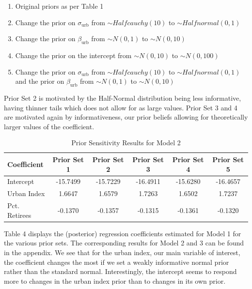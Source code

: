 \documentclass[12pt]{article}
\begin{document}
\begin{enumerate}
    \item Original priors as per Table 1
    \item Change the prior on \(\sigma_\text{urb}\) from \(\sim Halfcauchy(10)\) to \(\sim Halfnormal(0, 1)\)
    \item Change  the prior on \(\beta_\text{urb}\) from \(\sim N(0, 1)\) to \(\sim N(0, 10)\)
    \item Change  the prior on the intercept from \(\sim N(0, 10)\) to \(\sim N(0, 100)\)
    \item Change the prior on \(\sigma_\text{urb}\) from \(\sim Halfcauchy(10)\) to \(\sim Halfnormal(0, 1)\) and the prior on \(\beta_\text{urb}\) from \(\sim N(0, 1)\) to \(\sim N(0, 10)\)
\end{enumerate}

Prior Set 2 is motivated by the Half-Normal distribution being less informative, having thinner tails which does not allow for as large values. Prior Set 3 and 4 are motivated again by informativeness, our prior beliefs allowing for theoretically larger values of the coefficient.


\begin{table}[h]
    \centering
    \begin{tabular}{l|ccccc}
        \hline
        Coefficient & Prior Set 1 & Prior Set 2 & Prior Set 3 & Prior Set 4 & Prior Set 5 \\
        \hline
        Intercept      & -15.7499 & -15.7229 & -16.4911 & -15.6280 & -16.4657 \\
        Urban Index    & 1.6647 & 1.6579 & 1.7263 & 1.6502 & 1.7237 \\
        Pct. Retirees  & -0.1370 & -0.1357 & -0.1315 & -0.1361 & -0.1320 \\
        \hline
    \end{tabular}
    \caption{Prior Sensitivity Results for Model 2}
    \label{tab:Prior Sensitivity Results for Model 1}
\end{table}



Table 4 displays the (posterior) regression coefficients estimated for Model 1 for the various prior sets. The corresponding results for Model 2 and 3 can be found in the appendix. We see that for the urban index, our main variable of interest, the coefficient changes the most if we set a weakly informative normal prior rather than the standard normal. Interestingly, the intercept seems to respond more to changes in the urban index prior than to changes in its own prior.
\end{document}
